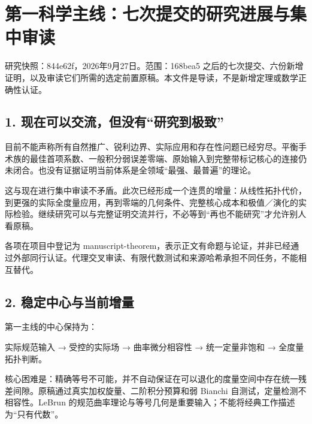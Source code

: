 \documentclass[
  10pt,
]{article}
\author{}
\date{}
\begin{document}
\hypertarget{ux7b2cux4e00ux79d1ux5b66ux4e3bux7ebfux4e03ux6b21ux63d0ux4ea4ux7684ux7814ux7a76ux8fdbux5c55ux4e0eux96c6ux4e2dux5ba1ux8bfb}{%
\section{第一科学主线：七次提交的研究进展与集中审读}\label{ux7b2cux4e00ux79d1ux5b66ux4e3bux7ebfux4e03ux6b21ux63d0ux4ea4ux7684ux7814ux7a76ux8fdbux5c55ux4e0eux96c6ux4e2dux5ba1ux8bfb}}

研究快照：844e62f，2026年9月27日。范围：168bea5
之后的七次提交、六份新增证明，以及审读它们所需的选定前置原稿。本文件是导读，不是新增定理或数学正确性认证。

\hypertarget{ux73b0ux5728ux53efux4ee5ux4ea4ux6d41ux4f46ux6ca1ux6709ux7814ux7a76ux5230ux6781ux81f4}{%
\subsection{1.
现在可以交流，但没有``研究到极致''}\label{ux73b0ux5728ux53efux4ee5ux4ea4ux6d41ux4f46ux6ca1ux6709ux7814ux7a76ux5230ux6781ux81f4}}

目前不能声称所有自然推广、锐利边界、实际应用和存在性问题已经穷尽。平衡手术族的最佳首项系数、一般积分弱误差零端、原始输入到完整带标记核心的连接仍未闭合。也没有证据证明当前体系是全领域``最强、最普遍''的理论。

这与现在进行集中审读不矛盾。此次已经形成一个连贯的增量：从线性拓扑代价，到更强的实际全度量应用，再到零端的几何条件、完整核心成本和极值／演化的实际检验。继续研究可以与完整证明交流并行，不必等到``再也不能研究''才允许别人看原稿。

各项在项目中登记为
manuscript-theorem，表示正文有命题与论证，并非已经通过外部同行认证。代理交叉审读、有限代数测试和来源哈希承担不同任务，不能相互替代。

\hypertarget{ux7a33ux5b9aux4e2dux5fc3ux4e0eux5f53ux524dux589eux91cf}{%
\subsection{2.
稳定中心与当前增量}\label{ux7a33ux5b9aux4e2dux5fc3ux4e0eux5f53ux524dux589eux91cf}}

第一主线的中心保持为：

实际规范输入 → 受控的实际场 → 曲率微分相容性 → 统一定量非饱和 →
全度量拓扑判断。

核心困难是：精确等号不可能，并不自动保证在可以退化的度量空间中存在统一残差间隙。原稿通过真实加权旋量、二阶积分预算和弱
Bianchi 自测试，定量检测不相容性。LeBrun
的规范曲率理论与等号几何是重要输入；不能将经典工作描述为``只有代数''。
\end{document}
